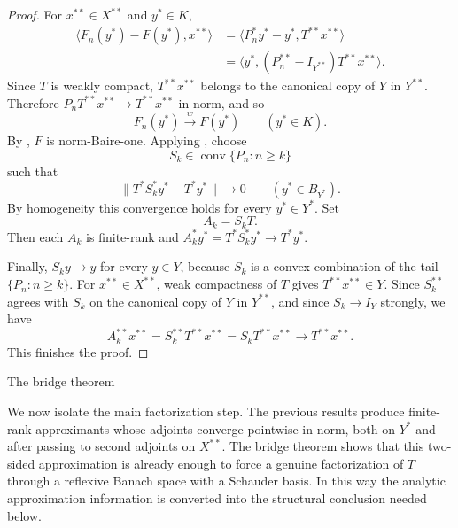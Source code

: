 \documentclass[11pt,reqno]{amsart}
\makeatletter
\theoremstyle{plain}
\theoremstyle{definition}
\newcounter{problempaper}
\newenvironment{problempaperbody}{%
  \setcounter{subsection}{0}%
  \setcounter{subsubsection}{0}%
  \setcounter{paragraph}{0}%
  \renewcommand{\thesubsection}{\arabic{subsection}}%
  \renewcommand{\thesubsubsection}{\thesubsection.\arabic{subsubsection}}%
  \renewcommand{\theparagraph}{\thesubsubsection.\arabic{paragraph}}%
  \let\problem@outersection\section
  \let\problem@outersubsection\subsection
  \let\problem@outersubsubsection\subsubsection
  \let\problem@outerparagraph\paragraph
  \let\section\problem@papersection
  \let\subsection\problem@papersubsection
  \let\subsubsection\problem@papersubsubsection
}{%
  \let\section\problem@outersection
  \let\subsection\problem@outersubsection
  \let\subsubsection\problem@outersubsubsection
  \let\paragraph\problem@outerparagraph
}
\newcommand{\problem@target}[2]{%
  \hypertarget{problem-\theproblempaper-#1-#2}{}%
}
\newcommand{\problem@paperheading}[3]{%
  \par\bigskip
  \problem@target{#1}{#2}%
  \noindent{\large\bfseries #2.\quad #3\par}%
  \nobreak\smallskip
}
\newcommand{\problem@papersubheading}[3]{%
  \par\medskip
  \problem@target{#1}{#2}%
  \noindent{\normalsize\bfseries #2.\quad #3\par}%
  \nobreak\smallskip
}
\newcommand{\problem@papersubsubheading}[3]{%
  \par\smallskip
  \problem@target{#1}{#2}%
  \noindent{\normalsize\itshape #2.\quad #3.\ }%
}
\def\problem@papersection{%
  \@ifstar{\problem@papersectionstar}{\problem@papersectionnostar}%
}
\def\problem@papersectionstar#1{%
  \par\bigskip\noindent{\large\bfseries #1\par}\nobreak\smallskip
}
\def\problem@papersectionnostar#1{%
  \refstepcounter{subsection}%
  \setcounter{subsubsection}{0}%
  \setcounter{paragraph}{0}%
  \problem@paperheading{section}{\thesubsection}{#1}%
  \problem@writecontentsline{section}{\thesubsection}{#1}%
}
\def\problem@papersubsection{%
  \@ifstar{\problem@papersubsectionstar}{\problem@papersubsectionnostar}%
}
\def\problem@papersubsectionstar#1{%
  \par\medskip\noindent{\normalsize\bfseries #1\par}\nobreak\smallskip
}
\def\problem@papersubsectionnostar#1{%
  \refstepcounter{subsubsection}%
  \setcounter{paragraph}{0}%
  \problem@papersubheading{subsection}{\thesubsubsection}{#1}%
  \problem@writecontentsline{subsection}{\thesubsubsection}{#1}%
}
\def\problem@papersubsubsection{%
  \@ifstar{\problem@papersubsubsectionstar}{\problem@papersubsubsectionnostar}%
}
\def\problem@papersubsubsectionstar#1{%
  \par\smallskip\noindent{\normalsize\itshape #1.\ }%
}
\def\problem@papersubsubsectionnostar#1{%
  \refstepcounter{paragraph}%
  \problem@papersubsubheading{subsubsection}{\theparagraph}{#1}%
  \problem@writecontentsline{subsubsection}{\theparagraph}{#1}%
}
\newcommand{\problem@writecontentsline}[3]{%
  \begingroup
  \protected@write\@auxout{}{%
    \string\problemcontentsentry{\theproblempaper}{#1}{#2}{#3}{\thepage}%
  }%
  \endgroup
}
\newcommand{\problemcontentsentry}[5]{%
  \@ifundefined{problemcontents@#1}{%
    \expandafter\gdef\csname problemcontents@#1\endcsname{}%
  }{}%
  \expandafter\g@addto@macro\csname problemcontents@#1\endcsname{%
    \problemcontentsline{#1}{#2}{#3}{#4}{#5}%
  }%
}
\newcommand{\problemcontentslink}[4]{%
  \hyperlink{problem-#1-#2-#3}{#4}%
}
\newcommand{\problemcontentsline}[5]{%
  \ifstrequal{#2}{section}{%
    \par\noindent
    \problemcontentslink{#1}{#2}{#3}{\makebox[2.5em][l]{#3}#4}%
    \nobreak\dotfill
    \problemcontentslink{#1}{#2}{#3}{#5}\par
  }{%
    \ifstrequal{#2}{subsection}{%
      \par\noindent\hspace*{1.5em}%
      \problemcontentslink{#1}{#2}{#3}{\makebox[3.5em][l]{#3}#4}%
      \nobreak\dotfill
      \problemcontentslink{#1}{#2}{#3}{#5}\par
    }{%
      \par\noindent\hspace*{3em}%
      \problemcontentslink{#1}{#2}{#3}{\makebox[4.5em][l]{#3}#4}%
      \nobreak\dotfill
      \problemcontentslink{#1}{#2}{#3}{#5}\par
    }%
  }%
}
\makeatother
\begin{document}
\begin{problempaperbody}
\begin{proof}
For $x^{**}\in X^{**}$ and $y^*\in K$,
\begin{equation*}
\begin{aligned}
        \langle F_n(y^*)-F(y^*),x^{**}\rangle
        &= \langle P_n^*y^*-y^*,T^{**}x^{**}\rangle \\
        &= \langle y^*,(P_n^{**}-I_{Y^{**}})T^{**}x^{**}\rangle .
\end{aligned}
\end{equation*}
Since $T$ is weakly compact, $T^{**}x^{**}$ belongs to the canonical copy of $Y$ in $Y^{**}$. Therefore $P_nT^{**}x^{**}\to T^{**}x^{**}$ in norm, and so
\begin{equation*}
        F_n(y^*)\xrightarrow{w}F(y^*)\qquad (y^*\in K).
\end{equation*}
By , $F$ is norm-Baire-one. Applying , choose
\begin{equation*}
        S_k\in\operatorname{conv}\{P_n\colon n\geq k\}
\end{equation*}
such that
\begin{equation*}
        \|T^*S_k^*y^*-T^*y^*\|\to0\qquad (y^*\in B_{Y^*}).
\end{equation*}
By homogeneity this convergence holds for every $y^*\in Y^*$. Set
\begin{equation*}
        A_k=S_kT .
\end{equation*}
Then each $A_k$ is finite-rank and $A_k^*y^*=T^*S_k^*y^*\to T^*y^*$.

Finally, $S_ky\to y$ for every $y\in Y$, because $S_k$ is a convex combination of the tail $\{P_n\colon n\geq k\}$. For $x^{**}\in X^{**}$, weak compactness of $T$ gives $T^{**}x^{**}\in Y$. Since $S_k^{**}$ agrees with $S_k$ on the canonical copy of $Y$ in $Y^{**}$, and since $S_k\to I_Y$ strongly, we have
\begin{equation*}
        A_k^{**}x^{**}=S_k^{**}T^{**}x^{**}=S_kT^{**}x^{**}\to T^{**}x^{**}.
\end{equation*}
This finishes the proof.
\end{proof}


\section{The bridge theorem}
\label{p5:sec:bridge}

We now isolate the main factorization step. The previous results produce finite-rank approximants whose adjoints converge pointwise in norm, both on $Y^*$ and after passing to second adjoints on $X^{**}$. The bridge theorem shows that this two-sided approximation is already enough to force a genuine factorization of $T$ through a reflexive Banach space with a Schauder basis. In this way the analytic approximation information is converted into the structural conclusion needed below.


\end{problempaperbody}
\end{document}
